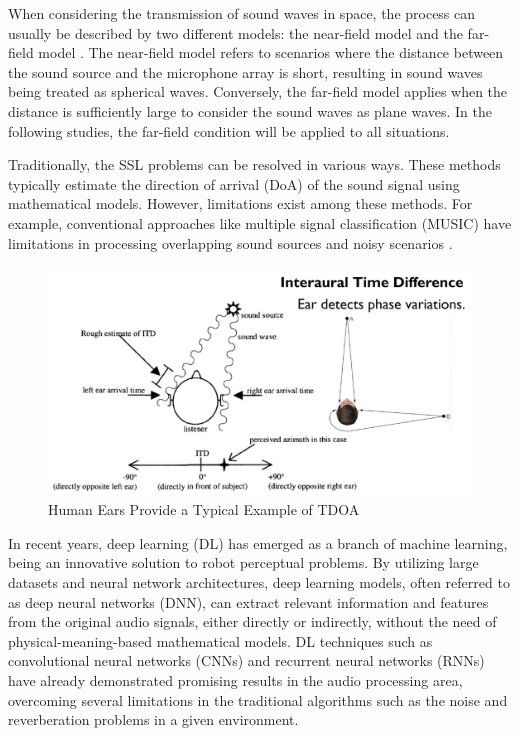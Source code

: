 When considering the transmission of sound waves in space, the process can usually be described by two different models: the near-field model and the far-field model \cite{westervelt_parametric_1963}. The near-field model refers to scenarios where the distance between the sound source and the microphone array is short, resulting in sound waves being treated as spherical waves. Conversely, the far-field model applies when the distance is sufficiently large to consider the sound waves as plane waves. In the following studies, the far-field condition will be applied to all situations.

Traditionally, the SSL problems can be resolved in various ways. These methods typically estimate the direction of arrival (DoA) of the sound signal using mathematical models. However, limitations exist among these methods. For example, conventional approaches like multiple signal classification (MUSIC) have limitations in processing overlapping sound sources and noisy scenarios \cite{limitation_MUSIC_2021}.

\begin{figure}[h]
    \centering
    \includegraphics[width=0.5\linewidth]{figures/Human_Ears_TDOA.png}
    \caption{Human Ears Provide a Typical Example of TDOA}
\end{figure}

In recent years, deep learning (DL) has emerged as a branch of machine learning, being an innovative solution to robot perceptual problems. By utilizing large datasets and neural network architectures, deep learning models, often referred to as deep neural networks (DNN), can extract relevant information and features from the original audio signals, either directly or indirectly, without the need of physical-meaning-based mathematical models. DL techniques such as convolutional neural networks (CNNs) and recurrent neural networks (RNNs) have already demonstrated promising results in the audio processing area, overcoming several limitations in the traditional algorithms such as the noise and reverberation problems in a given environment.

